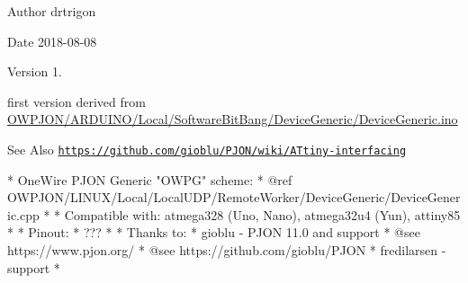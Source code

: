 \begin{DoxyAuthor}{Author}
drtrigon 
\end{DoxyAuthor}
\begin{DoxyDate}{Date}
2018-\/08-\/08 
\end{DoxyDate}
\begin{DoxyVersion}{Version}
1. \begin{DoxyItemize}
\item first version derived from \hyperlink{ARDUINO_2Local_2SoftwareBitBang_2DeviceGeneric_2DeviceGeneric_8ino}{O\-W\-P\-J\-O\-N/\-A\-R\-D\-U\-I\-N\-O/\-Local/\-Software\-Bit\-Bang/\-Device\-Generic/\-Device\-Generic.\-ino} \end{DoxyItemize}

\end{DoxyVersion}
\begin{DoxySeeAlso}{See Also}
\href{https://github.com/gioblu/PJON/wiki/ATtiny-interfacing}{\tt https\-://github.\-com/gioblu/\-P\-J\-O\-N/wiki/\-A\-Ttiny-\/interfacing}
\end{DoxySeeAlso}
\begin{DoxyVerb}* OneWire PJON Generic "OWPG" scheme:
*   @ref OWPJON/LINUX/Local/LocalUDP/RemoteWorker/DeviceGeneric/DeviceGeneric.cpp
*
* Compatible with: atmega328 (Uno, Nano), atmega32u4 (Yun), attiny85
*
* Pinout:
*   ???
*
* Thanks to:
* gioblu - PJON 11.0 and support
*          @see https://www.pjon.org/
*          @see https://github.com/gioblu/PJON
* fredilarsen - support
* \end{DoxyVerb}


